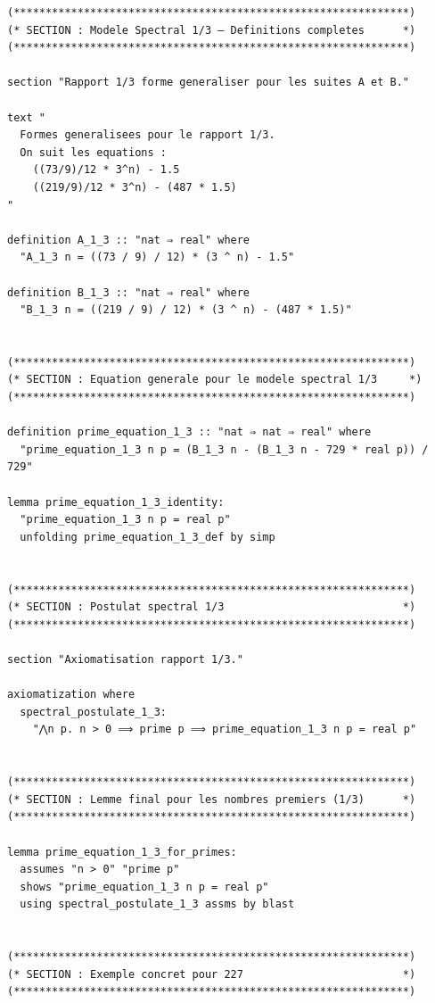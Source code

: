 \documentclass[a4paper,11pt]{article}
\begin{document}
\begin{holcode}[title={\textcolor{white}{File: methode\_spectral.thy -- Part 3/4}}]
\begin{lstlisting}
(**************************************************************)
(* SECTION : Modele Spectral 1/3 – Definitions completes      *)
(**************************************************************)

section "Rapport 1/3 forme generaliser pour les suites A et B."

text "
  Formes generalisees pour le rapport 1/3.
  On suit les equations :
    ((73/9)/12 * 3^n) - 1.5
    ((219/9)/12 * 3^n) - (487 * 1.5)
"

definition A_1_3 :: "nat ⇒ real" where
  "A_1_3 n = ((73 / 9) / 12) * (3 ^ n) - 1.5"

definition B_1_3 :: "nat ⇒ real" where
  "B_1_3 n = ((219 / 9) / 12) * (3 ^ n) - (487 * 1.5)"


(**************************************************************)
(* SECTION : Equation generale pour le modele spectral 1/3     *)
(**************************************************************)

definition prime_equation_1_3 :: "nat ⇒ nat ⇒ real" where
  "prime_equation_1_3 n p = (B_1_3 n - (B_1_3 n - 729 * real p)) / 729"

lemma prime_equation_1_3_identity:
  "prime_equation_1_3 n p = real p"
  unfolding prime_equation_1_3_def by simp


(**************************************************************)
(* SECTION : Postulat spectral 1/3                            *)
(**************************************************************)

section "Axiomatisation rapport 1/3."

axiomatization where
  spectral_postulate_1_3:
    "⋀n p. n > 0 ⟹ prime p ⟹ prime_equation_1_3 n p = real p"


(**************************************************************)
(* SECTION : Lemme final pour les nombres premiers (1/3)      *)
(**************************************************************)

lemma prime_equation_1_3_for_primes:
  assumes "n > 0" "prime p"
  shows "prime_equation_1_3 n p = real p"
  using spectral_postulate_1_3 assms by blast


(**************************************************************)
(* SECTION : Exemple concret pour 227                         *)
(**************************************************************)


\end{lstlisting}
\end{holcode}
\end{document}
